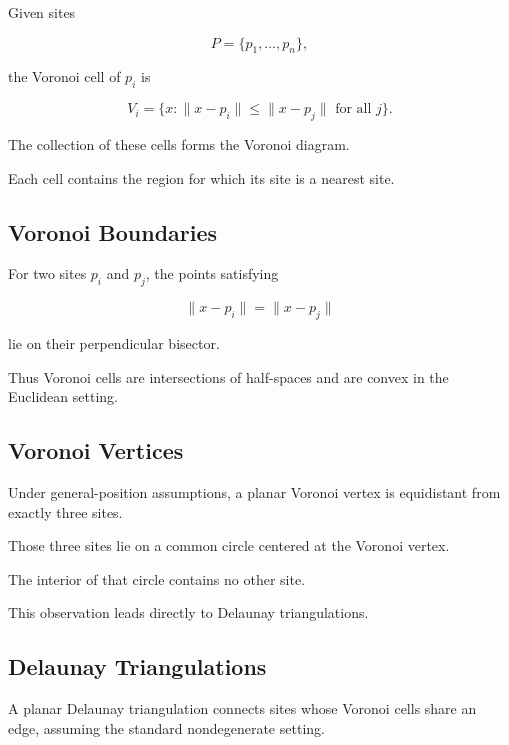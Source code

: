 Given sites

\[
P=\{p_1,\ldots,p_n\},
\]

the Voronoi cell of \(p_i\) is

\[
\boxed{
V_i
=
\{
x:
\|x-p_i\|
\leq
\|x-p_j\|
\text{ for all }j
\}.
}
\]

The collection of these cells forms the Voronoi diagram.

Each cell contains the region for which its site is a nearest site.

\subsection{Voronoi Boundaries}
\label{subsec:voronoi-boundaries-computational}

For two sites \(p_i\) and \(p_j\), the points satisfying

\[
\|x-p_i\|
=
\|x-p_j\|
\]

lie on their perpendicular bisector.

Thus Voronoi cells are intersections of half-spaces and are convex in the
Euclidean setting.

\subsection{Voronoi Vertices}
\label{subsec:voronoi-vertices}

Under general-position assumptions, a planar Voronoi vertex is equidistant
from exactly three sites.

Those three sites lie on a common circle centered at the Voronoi vertex.

The interior of that circle contains no other site.

This observation leads directly to Delaunay triangulations.

\subsection{Delaunay Triangulations}
\label{subsec:computational-delaunay}

A planar Delaunay triangulation connects sites whose Voronoi cells share an
edge, assuming the standard nondegenerate setting.

